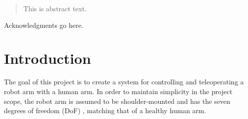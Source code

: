 \uomtoc


\begin{abstract} %
  This is abstract text. 
  
  \lipsum[1-2]
\end{abstract}%
\clearpage



\begin{uomoriginality}
  \uomoriginalitydeclaration 
\end{uomoriginality}
\uomcopyrightstatement



\begin{uomacknowledgements}
Acknowledgments go here.
\end{uomacknowledgements}



\uomstartmainbody %



\section{Introduction} %
  
  The goal of this project is to create a system for controlling and teleoperating a robot arm with a human arm. 
  In order to maintain simplicity in the project scope, the robot arm is assumed to be shoulder-mounted and has the seven degrees of freedom (DoF) \cite{ref:arm_dofs}, matching that of a healthy human arm.

